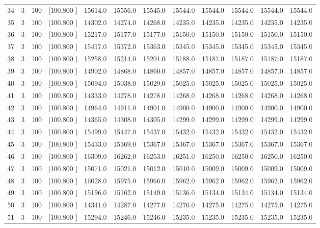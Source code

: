 \documentclass[12pt,a4paper]{article}
\begin{document}
\begin{center}
{\begin{tabular}{r r r r r r r r r r r r}
  34&  3&100&[100.800   ]& 15614.0& 15556.0& 15545.0& 15544.0& 15544.0& 15544.0& 15544.0& 15544.0\\[-0.02in]
  35&  3&100&[100.800   ]& 14302.0& 14274.0& 14268.0& 14235.0& 14235.0& 14235.0& 14235.0& 14235.0\\[-0.02in]
  36&  3&100&[100.800   ]& 15217.0& 15177.0& 15177.0& 15150.0& 15150.0& 15150.0& 15150.0& 15150.0\\[-0.02in]
  37&  3&100&[100.800   ]& 15417.0& 15372.0& 15363.0& 15345.0& 15345.0& 15345.0& 15345.0& 15345.0\\[-0.02in]
  38&  3&100&[100.800   ]& 15258.0& 15214.0& 15201.0& 15188.0& 15187.0& 15187.0& 15187.0& 15187.0\\[-0.02in]
  39&  3&100&[100.800   ]& 14902.0& 14868.0& 14860.0& 14857.0& 14857.0& 14857.0& 14857.0& 14857.0\\[-0.02in]
  40&  3&100&[100.800   ]& 15094.0& 15038.0& 15029.0& 15025.0& 15025.0& 15025.0& 15025.0& 15025.0\\[-0.02in]
  41&  3&100&[100.800   ]& 14333.0& 14278.0& 14278.0& 14268.0& 14268.0& 14268.0& 14268.0& 14268.0\\[-0.02in]
  42&  3&100&[100.800   ]& 14964.0& 14911.0& 14901.0& 14900.0& 14900.0& 14900.0& 14900.0& 14900.0\\[-0.02in]
  43&  3&100&[100.800   ]& 14365.0& 14308.0& 14305.0& 14299.0& 14299.0& 14299.0& 14299.0& 14299.0\\[-0.02in]
  44&  3&100&[100.800   ]& 15499.0& 15447.0& 15437.0& 15432.0& 15432.0& 15432.0& 15432.0& 15432.0\\[-0.02in]
  45&  3&100&[100.800   ]& 15433.0& 15369.0& 15367.0& 15367.0& 15367.0& 15367.0& 15367.0& 15367.0\\[-0.02in]
  46&  3&100&[100.800   ]& 16309.0& 16262.0& 16253.0& 16251.0& 16250.0& 16250.0& 16250.0& 16250.0\\[-0.02in]
  47&  3&100&[100.800   ]& 15071.0& 15021.0& 15012.0& 15010.0& 15009.0& 15009.0& 15009.0& 15009.0\\[-0.02in]
  48&  3&100&[100.800   ]& 16028.0& 15975.0& 15966.0& 15962.0& 15962.0& 15962.0& 15962.0& 15962.0\\[-0.02in]
  49&  3&100&[100.800   ]& 15196.0& 15162.0& 15149.0& 15136.0& 15134.0& 15134.0& 15134.0& 15134.0\\[-0.02in]
  50&  3&100&[100.800   ]& 14341.0& 14287.0& 14277.0& 14276.0& 14275.0& 14275.0& 14275.0& 14275.0\\[-0.02in]
  51&  3&100&[100.800   ]& 15294.0& 15246.0& 15246.0& 15235.0& 15235.0& 15235.0& 15235.0& 15235.0\\[-0.02in]

\end{tabular}}
\end{center}
\end{document}
